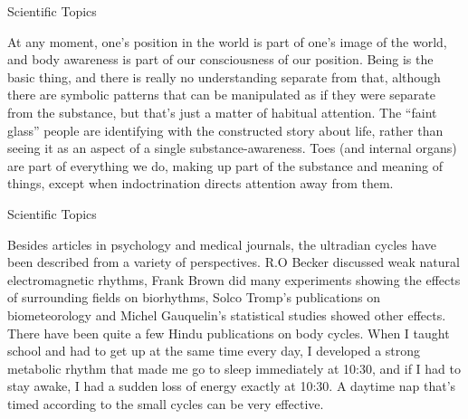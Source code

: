 \documentclass[11pt,oneside,openany,extrafontsizes]{memoir}
\begin{document}
\begin{standalonequote}{Scientific Topics}

    \begin{answer}
        At any moment, one's position in the world is part of one's image of the world, and body awareness is part of our consciousness of our position. Being is the basic thing, and there is really no understanding separate from that, although there are symbolic patterns that can be manipulated as if they were separate from the substance, but that's just a matter of habitual attention. The \enquote{faint glass} people are identifying with the constructed story about life, rather than seeing it as an aspect of a single substance-awareness. Toes (and internal organs) are part of everything we do, making up part of the substance and meaning of things, except when indoctrination directs attention away from them.
    \end{answer}
\end{standalonequote}

\begin{standalonequote}{Scientific Topics}

    \begin{answer}
        Besides articles in psychology and medical journals, the ultradian cycles have been described from a variety of perspectives. R.O Becker discussed weak natural electromagnetic rhythms, Frank Brown did many experiments showing the effects of surrounding fields on biorhythms, Solco Tromp's publications on biometeorology and Michel Gauquelin's statistical studies showed other effects. There have been quite a few Hindu publications on body cycles. When I taught school and had to get up at the same time every day, I developed a strong metabolic rhythm that made me go to sleep immediately at 10:30, and if I had to stay awake, I had a sudden loss of energy exactly at 10:30. A daytime nap that's timed according to the small cycles can be very effective.     
    \end{answer}
\end{standalonequote}
\end{document}

